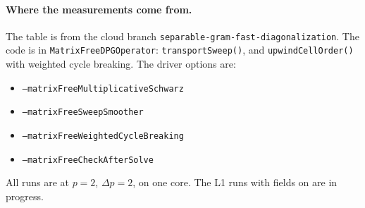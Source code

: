 \documentclass[11pt]{article}
\theoremstyle{remark}
\begin{document}
\paragraph{Where the measurements come from.}  {\sloppy The table is from the cloud branch
\texttt{separable-gram-fast-diagonalization}.  The code is in \texttt{MatrixFreeDPGOperator}: \texttt{transportSweep()},
and \texttt{upwindCellOrder()} with weighted cycle breaking.  The driver options are:
\begin{itemize}[nosep]
  \item \texttt{--matrixFreeMultiplicativeSchwarz}
  \item \texttt{--matrixFreeSweepSmoother}
  \item \texttt{--matrixFreeWeightedCycleBreaking}
  \item \texttt{--matrixFreeCheckAfterSolve}
\end{itemize}
All runs are at $p=2$, $\Delta p=2$, on one core.  The L1 runs with fields on are in progress.\par}
\end{document}
